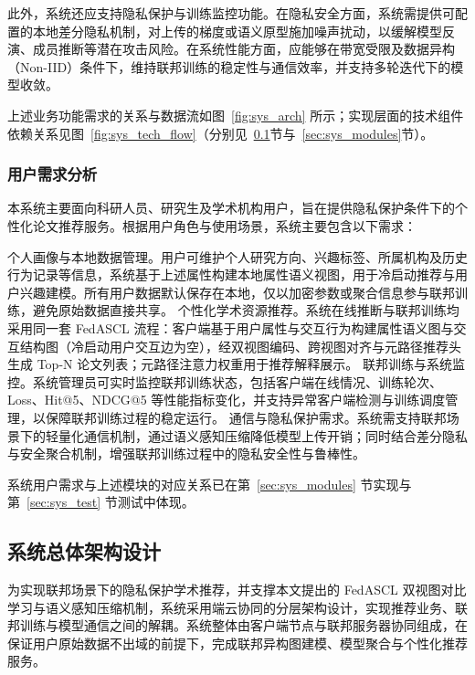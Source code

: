 此外，系统还应支持隐私保护与训练监控功能。在隐私安全方面，系统需提供可配置的本地差分隐私机制，对上传的梯度或语义原型施加噪声扰动，以缓解模型反演、成员推断等潜在攻击风险。在系统性能方面，应能够在带宽受限及数据异构（Non-IID）条件下，维持联邦训练的稳定性与通信效率，并支持多轮迭代下的模型收敛。

上述业务功能需求的关系与数据流如图~\ref{fig:sys_arch} 所示；实现层面的技术组件依赖关系见图~\ref{fig:sys_tech_flow}（分别见~\ref{sec:sys_architecture}节与~\ref{sec:sys_modules}节）。

\subsubsection{用户需求分析}

本系统主要面向科研人员、研究生及学术机构用户，旨在提供隐私保护条件下的个性化论文推荐服务。根据用户角色与使用场景，系统主要包含以下需求：

\begin{cnenumerate}
    \cnitem 个人画像与本地数据管理。用户可维护个人研究方向、兴趣标签、所属机构及历史行为记录等信息，系统基于上述属性构建本地属性语义视图，用于冷启动推荐与用户兴趣建模。所有用户数据默认保存在本地，仅以加密参数或聚合信息参与联邦训练，避免原始数据直接共享。
    \cnitem 个性化学术资源推荐。系统在线推断与联邦训练均采用同一套 FedASCL 流程：客户端基于用户属性与交互行为构建属性语义图与交互结构图（冷启动用户交互边为空），经双视图编码、跨视图对齐与元路径推荐头生成 Top-N 论文列表；元路径注意力权重用于推荐解释展示。
    \cnitem 联邦训练与系统监控。系统管理员可实时监控联邦训练状态，包括客户端在线情况、训练轮次、Loss、Hit@5、NDCG@5 等性能指标变化，并支持异常客户端检测与训练调度管理，以保障联邦训练过程的稳定运行。
    \cnitem 通信与隐私保护需求。系统需支持联邦场景下的轻量化通信机制，通过语义感知压缩降低模型上传开销；同时结合差分隐私与安全聚合机制，增强联邦训练过程中的隐私安全性与鲁棒性。
\end{cnenumerate}

系统用户需求与上述模块的对应关系已在第~\ref{sec:sys_modules} 节实现与第~\ref{sec:sys_test} 节测试中体现。

\subsection{系统总体架构设计}
\label{sec:sys_architecture}

为实现联邦场景下的隐私保护学术推荐，并支撑本文提出的 FedASCL 双视图对比学习与语义感知压缩机制，系统采用端云协同的分层架构设计，实现推荐业务、联邦训练与模型通信之间的解耦。系统整体由客户端节点与联邦服务器协同组成，在保证用户原始数据不出域的前提下，完成联邦异构图建模、模型聚合与个性化推荐服务。

